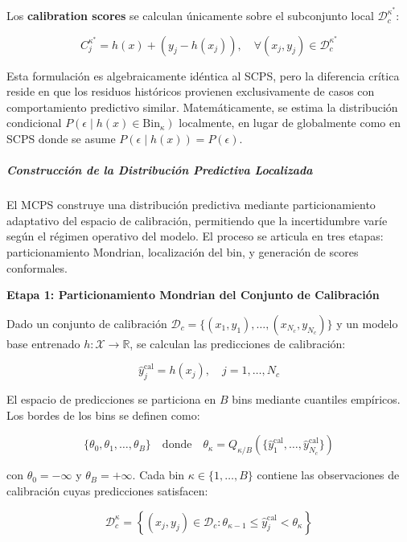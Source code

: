 Los \textbf{calibration scores} se calculan únicamente sobre el subconjunto local $\mathcal{D}_c^{\kappa^*}$:

\begin{equation}
C_j^{\kappa^*} = h(x) + (y_j - h(x_j)), \quad \forall (x_j, y_j) \in \mathcal{D}_c^{\kappa^*}
\end{equation}

Esta formulación es algebraicamente idéntica al SCPS, pero la diferencia crítica reside en que los residuos históricos provienen exclusivamente de casos con comportamiento predictivo similar. Matemáticamente, se estima la distribución condicional $P(\epsilon \mid h(x) \in \text{Bin}_{\kappa})$ localmente, en lugar de globalmente como en SCPS donde se asume $P(\epsilon \mid h(x)) = P(\epsilon)$.

\subparagraph{Construcción de la Distribución Predictiva Localizada}

El MCPS construye una distribución predictiva mediante particionamiento adaptativo del espacio de calibración, permitiendo que la incertidumbre varíe según el régimen operativo del modelo. El proceso se articula en tres etapas: particionamiento Mondrian, localización del bin, y generación de scores conformales.

\textbf{Etapa 1: Particionamiento Mondrian del Conjunto de Calibración}

Dado un conjunto de calibración $\mathcal{D}_c = \{(x_1, y_1), \ldots, (x_{N_c}, y_{N_c})\}$ y un modelo base entrenado $h: \mathcal{X} \rightarrow \mathbb{R}$, se calculan las predicciones de calibración:

\begin{equation}
\hat{y}_j^{\text{cal}} = h(x_j), \quad j = 1, \ldots, N_c
\end{equation}

El espacio de predicciones se particiona en $B$ bins mediante cuantiles empíricos. Los bordes de los bins se definen como:

\begin{equation}
\{\theta_0, \theta_1, \ldots, \theta_B\} \quad \text{donde} \quad \theta_{\kappa} = Q_{\kappa/B}\left(\{\hat{y}_1^{\text{cal}}, \ldots, \hat{y}_{N_c}^{\text{cal}}\}\right)
\label{eq:mcps_bin_edges}
\end{equation}

con $\theta_0 = -\infty$ y $\theta_B = +\infty$. Cada bin $\kappa \in \{1, \ldots, B\}$ contiene las observaciones de calibración cuyas predicciones satisfacen:

\begin{equation}
\mathcal{D}_c^{\kappa} = \left\{(x_j, y_j) \in \mathcal{D}_c : \theta_{\kappa-1} \leq \hat{y}_j^{\text{cal}} < \theta_{\kappa}\right\}
\end{equation}

